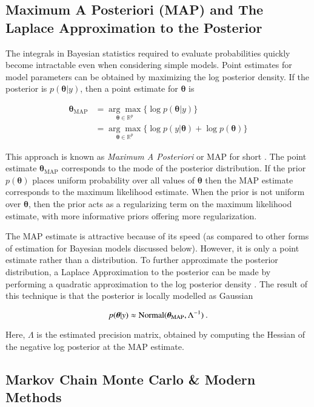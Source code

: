 \subsection{Maximum A Posteriori (MAP) and The Laplace Approximation to the Posterior}

The integrals in Bayesian statistics required to evaluate probabilities quickly become intractable even when considering simple models. Point estimates for model parameters can be obtained by maximizing the log posterior density.  If the posterior is $p(\bm{\theta} \vert y)$, then a point estimate for $\bm{\theta}$ is

\begin{align}
	\bm{\theta}_{\text{MAP}} &= \underset{\bm{\theta} \in \mathbb{R}^p}{\arg\max} \Big\{ \log p(\bm{\theta} \vert y) \Big\} \nonumber \\ 
	& = \underset{\bm{\theta} \in \mathbb{R}^p}{\arg\max} \Big\{\log p(y \vert \bm{\theta}) + \log p(\bm{\theta}) \Big\}  \nonumber
\end{align}

\noindent This approach is known as \textit{Maximum A Posteriori} or MAP for short \cite{murphy2012machine}.  The point estimate  $\bm{\theta}_{\text{MAP}} $ corresponds to the mode of the posterior distribution.  If the prior $p(\bm{\theta})$ places uniform probability over all values of $\bm{\theta}$ then the MAP estimate corresponds to the maximum likelihood estimate.  When the prior  is not uniform over $\bm{\theta}$, then the prior acts as a regularizing term on the maximum likelihood estimate, with more informative priors offering more regularization.

The MAP estimate is attractive because of its speed (as compared to other forms of estimation for Bayesian models discussed below).  However, it is only a point estimate rather than a distribution.  To further approximate the posterior distribution, a Laplace Approximation to the posterior can be made by performing a quadratic approximation to the log posterior density \cite{murphy2012machine}.  The result of this technique is that the posterior is locally modelled as Gaussian

$$ p(\bm{\theta} \vert y)  \approx \operatorname{Normal}(\bm{\theta}_{\text{MAP}}, \Lambda^{-1}) \>. $$

\noindent Here, $\Lambda$ is the estimated precision matrix, obtained by computing the Hessian of the negative log posterior at the MAP estimate.


\subsection{Markov Chain Monte Carlo \& Modern Methods}

